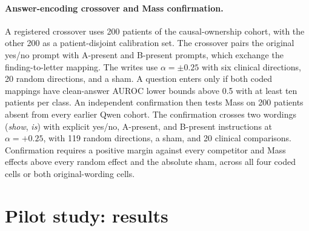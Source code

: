 \documentclass[11pt]{article}
\begin{document}
\paragraph{Answer-encoding crossover and Mass confirmation.} A registered crossover uses 200 patients of the causal-ownership cohort, with the other 200 as a patient-disjoint calibration set. The crossover pairs the original yes/no prompt with A-present and B-present prompts, which exchange the finding-to-letter mapping. The writes use $\alpha=\pm0.25$ with six clinical directions, 20 random directions, and a sham. A question enters only if both coded mappings have clean-answer AUROC lower bounds above 0.5 with at least ten patients per class. An independent confirmation then tests Mass on 200 patients absent from every earlier Qwen cohort. The confirmation crosses two wordings (\textit{show}, \textit{is}) with explicit yes/no, A-present, and B-present instructions at $\alpha=+0.25$, with 119 random directions, a sham, and 20 clinical comparisons. Confirmation requires a positive margin against every competitor and Mass effects above every random effect and the absolute sham, across all four coded cells or both original-wording cells.


\section{Pilot study: results}
\label{app:seed-results}
\end{document}
